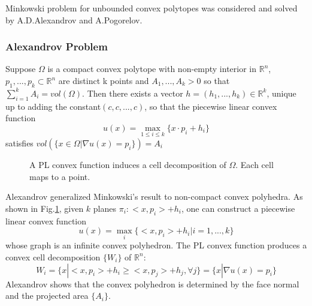 \documentclass[runningheads]{llncs}
\begin{document}
Minkowski problem for unbounded convex polytopes was considered and solved by A.D.Alexandrov and A.Pogorelov.

\subsubsection{Alexandrov Problem}

\begin{theorem}
Suppose $\Omega$ is a compact convex polytope with non-empty interior in $\mathbb{R}^n$, $p_1, ... , p_k\subset \mathbb{R}^n$ are distinct k points and $A_1,...,A_k>0$ so that $\sum^k_{i=1}A_i=vol(\Omega)$. Then there exists a vector $h =(h_1,...,h_k)\in \mathbb{R}^k$, unique up to adding the constant$(c,c,...,c)$, so that the piecewise linear convex function$$u(x)=\max_{1\leq i\leq k}\{x\cdot p_i + h_i\}$$ satisfies $vol(\{x\in \Omega | \nabla u(x)=p_i\})=A_i$
\end{theorem}

\begin{figure}
\centering
{}
\caption{A PL convex function induces a cell decomposition of $\Omega$. Each cell maps to a point.}
\label{fig:Alex}
\end{figure}

Alexandrov generalized Minkowski's result to non-compact convex polyhedra. As shown in Fig.\ref{fig:Alex}, given $k$ planes $\pi_i : <x,p_i> + h_i$, one can construct a piecewise linear convex function $$u(x) = \max _i \{<x,p_i>+h_i | i = 1,...,k\}$$ whose graph is an infinite convex polyhedron. The PL convex function produces a convex cell decomposition $\{W_i\}$ of $\mathbb{R}^n$: $$W_i = \{x | <x,p_i>+h_i\geq <x,p_j> +h_j, \forall j\}=\{x|\nabla u(x)=p_i\}$$
Alexandrov shows that the convex polyhedron is determined by the face normal and the projected area $\{A_i\}$.
\end{document}
